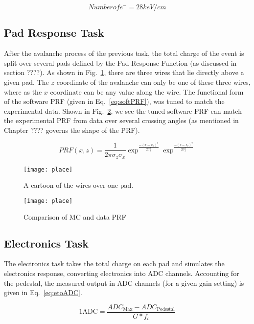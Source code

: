 \begin{equation}
Number of e^{-} = 28 keV/cm
\label{eq:kev2el}
\end{equation}

\subsection{Pad Response Task}
After the avalanche process of the previous task, the total charge of the event is split over several pads defined by the Pad Response Function (as discussed in section ????). As shown in Fig.~\ref{fig:onepad}, there are three wires that lie directly above a given pad. The $z$ coordinate of the avalanche can only be one of these three wires, where as the $x$ coordinate can be any value along the wire. The functional form of the software PRF (given in Eq.~\ref{eq:softPRF}), was tuned to match the experimental data. Shown in Fig.~\ref{fig:mcdataPRF}, we see the tuned software PRF can match the experimental PRF from data over several crossing angles (as mentioned in Chapter ???? governs the shape of the PRF). 

\begin{equation}
PRF(x,z) = \frac{1}{2\pi\sigma_z\sigma_x}\exp^{\frac{-{(x-x_o)}^2}{2\sigma_x^2}}\exp^{\frac{-{(z-z_o)}^2}{2\sigma_z^2}}
\label{eq:softPRF}
\end{equation}

\begin{figure}
\texttt{[image: place]}
\caption{A cartoon of the wires over one pad. }
\label{fig:onepad}
\end{figure}

\begin{figure}
\texttt{[image: place]}
\caption{Comparison of MC and data PRF}
\label{fig:mcdataPRF}
\end{figure}

\subsection{Electronics Task}
The electronics task takes the total charge on each pad and simulates the electronics response, converting electronics into ADC channels. Accounting for the pedestal, the measured output in ADC channels (for a given gain setting) is given in Eq.~\ref{eq:etoADC}.

\begin{equation}
\mathrm{1 ADC }= \frac{ADC_{\mathrm{Max}} - ADC_{\mathrm{Pedestal}}}{G*f_c}
\label{eq:etoADC}
\end{equation}


